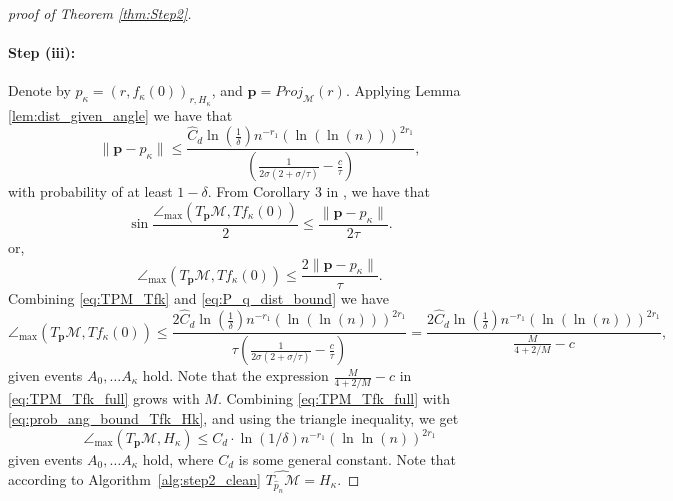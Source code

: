 \documentclass[12pt]{article}
\theoremstyle{remark}
\newcommand{\MM}{\mathcal{M}}
\newcommand{\maxangle}{\angle_{\max}}
\begin{document}
\begin{proof}[proof of Theorem \ref{thm:Step2}]
	\paragraph*{Step (iii):} Denote by $p_{\kappa}=(r,f_\kappa(0))_{r, H_{\kappa}}$, and $\mathrm{\mathbf{p}} = Proj_\MM(r)$. Applying Lemma \ref{lem:dist_given_angle} we have that 
	\begin{equation}\label{eq:P_q_dist_bound}
		\|\mathrm{\mathbf{p}} - p_{\kappa}\| \leq \frac{\hat C_{d}\ln\left(\frac{1}{\delta}\right) n^{-r_1}\left(\ln\left(\ln(n) \right)\right)^{2r_1}}{\left(\frac{1}{2\sigma(2+\sigma/\tau)}-\frac{c}{\tau} \right)},
	\end{equation}
	with probability of at least $1-\delta$. From Corollary 3 in \cite{boissonnat2017reach}, we have that 
	\begin{equation} \label{eq:sin_TPM_Tfk}
		\sin \frac{\maxangle(T_{\mathbf{p}}\MM,Tf_\kappa(0))}{2} \leq \frac{\|\mathrm{\mathbf{p}}-p_\kappa\|}{2\tau}.
	\end{equation}
	or,
	\begin{equation} \label{eq:TPM_Tfk}
		\maxangle(T_{\mathbf{p}}\MM,Tf_\kappa(0)) \leq \frac{2\|\mathrm{\mathbf{p}}-p_\kappa\|}{\tau}.
	\end{equation}
	Combining \ref{eq:TPM_Tfk} and \eqref{eq:P_q_dist_bound} we have 
	\begin{equation} \label{eq:TPM_Tfk_full}
		\maxangle(T_{\mathbf{p}}\MM,Tf_\kappa(0))
		\leq \frac{2\hat C_{d}\ln\left(\frac{1}{\delta}\right) n^{-r_1}\left(\ln\left(\ln(n) \right)\right)^{2r_1}}{\tau\left(\frac{1}{2\sigma(2+\sigma/\tau)}-\frac{c}{\tau} \right)} = 
		\frac{2\hat C_{d}\ln\left(
			\frac{1}{\delta}\right) n^{-r_1}\left(\ln\left(\ln(n) \right)\right)^{2r_1}}{\frac{M}{4 + 2/M} -c} 
		,
	\end{equation}
	given events $A_0,\ldots A_\kappa$ hold.
	Note that the expression $\frac{M}{4 + 2/M} -c $ in \eqref{eq:TPM_Tfk_full} grows with $M$.
	Combining \eqref{eq:TPM_Tfk_full} with \eqref{eq:prob_ang_bound_Tfk_Hk}, and using the triangle inequality, we get 
	\begin{equation}\label{eq:res_thm33_tang}
		\maxangle(T_{\mathbf{p}}\MM,H_\kappa) \leq C_d \cdot \ln(1/\delta)n^{-r_1} (\ln \ln(n))^{2 r_1}
	\end{equation}
	given events $A_0,\ldots A_\kappa$ hold, where $C_d$ is some general constant. 
	Note that according to Algorithm~\ref{alg:step2_clean}  $\widehat{T_{\hat p_n}\MM} = H_\kappa$.%
	

\end{proof}
\end{document}
